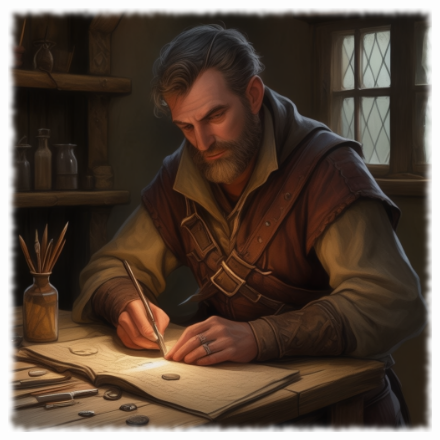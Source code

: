 \begin{figure}%
\begin{center}
\includegraphics[scale=0.24]{img/ai-images/human-merchant.png}
\end{center}
\end{figure}

